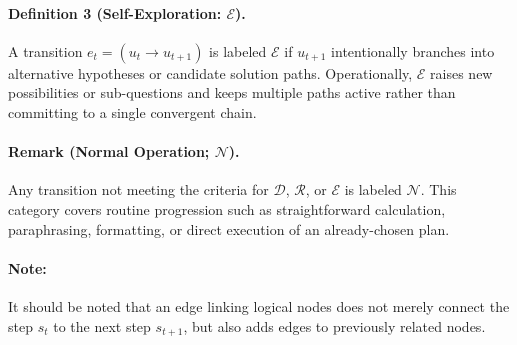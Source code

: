 \paragraph{Definition 3 (Self-Exploration: \(\mathcal{E}\)).}
A transition \(e_t=(u_t \rightarrow u_{t+1})\) is labeled \(\mathcal{E}\) if \(u_{t+1}\) intentionally branches into alternative hypotheses or candidate solution paths.
Operationally, \(\mathcal{E}\) raises new possibilities or sub-questions and keeps multiple paths active rather than committing to a single convergent chain.

\paragraph{Remark (Normal Operation; \(\mathcal{N}\)).}
Any transition not meeting the criteria for \(\mathcal{D}\), \(\mathcal{R}\), or \(\mathcal{E}\) is labeled \(\mathcal{N}\).
This category covers routine progression such as straightforward calculation, paraphrasing, formatting, or direct execution of an already-chosen plan.

\paragraph{Note:} It should be noted that an edge linking logical nodes does not merely connect the step $s_t$ to the next step $s_{t+1}$, but also adds edges to previously related nodes.

